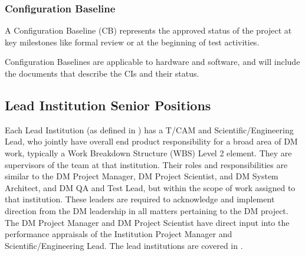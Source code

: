 \subsubsection{Configuration Baseline \label{sect:BSLdef}}

A Configuration Baseline (CB) represents the approved status of the project at key milestones like formal review or at the beginning of test activities.

Configuration Baselines are applicable to hardware and software, and will include the documents that describe the CIs and their status.

\subsection{Lead Institution Senior Positions}

Each Lead Institution (as defined in ) has a T/CAM and Scientific/Engineering Lead, who jointly have overall end product responsibility for a broad area of DM work, typically a Work Breakdown Structure (WBS) Level 2 element. They are supervisors of the team at that institution.  Their roles and responsibilities are similar to the DM Project Manager, DM Project Scientist, and DM System Architect, and DM QA and Test Lead, but within the scope of work assigned to that institution.  These leaders are required to acknowledge and implement direction from the DM leadership in all matters pertaining to the DM project.  The DM Project Manager and DM Project Scientist have direct input into the performance appraisals of the Institution Project Manager and Scientific/Engineering Lead. 
The lead institutions are covered  in .
